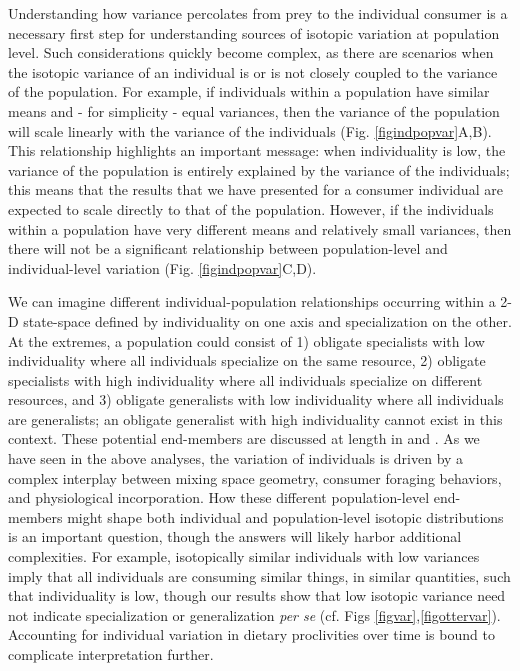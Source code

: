 \documentclass{frontiersSCNS}
\begin{document}
Understanding how variance percolates from prey to the individual consumer is a necessary first step for understanding sources of isotopic variation at population level.
Such considerations quickly become complex, as there are scenarios when the isotopic variance of an individual is or is not closely coupled to the variance of the population.
For example, if individuals within a population have similar means and - for simplicity - equal variances, then the variance of the population will scale linearly with the variance of the individuals (Fig. \ref{figindpopvar}A,B).
This relationship highlights an important message: when individuality is low, the variance of the population is entirely explained by the variance of the individuals; this means that the results that we have presented for a consumer individual are expected to scale directly to that of the population. 
However, if the individuals within a population have very different means and relatively small variances, then there will not be a significant relationship between population-level and individual-level variation (Fig. \ref{figindpopvar}C,D).

We can imagine different individual-population relationships occurring within a 2-D state-space defined by individuality on one axis and specialization on the other.
At the extremes, a population could consist of
1) obligate specialists with low individuality where all individuals specialize on the same resource,
2) obligate specialists with high individuality where all individuals specialize on different resources, and
3) obligate generalists with low individuality where all individuals are generalists; an obligate generalist with high individuality cannot exist in this context. %
These potential end-members are discussed at length in \citet{Bearhop:2004im} and \citet{Fink:2012eg}.
As we have seen in the above analyses, the variation of individuals is driven by a complex interplay between mixing space geometry, consumer foraging behaviors, and physiological incorporation.
How these different population-level end-members might shape both individual and population-level isotopic distributions is an important question, though the answers will likely harbor additional complexities.
For example, isotopically similar individuals with low variances imply that all individuals are consuming similar things, in similar quantities, such that individuality is low, though our results show that low isotopic variance need not indicate specialization or generalization \emph{per se} (cf. Figs \ref{figvar},\ref{figottervar}).
Accounting for individual variation in dietary proclivities over time is bound to complicate interpretation further.
\end{document}
